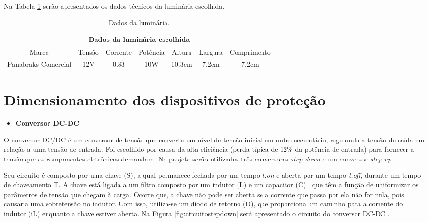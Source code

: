 Na Tabela \ref{tab:luminaria} serão apresentados os dados técnicos da luminária escolhida.

\begin{table}[H]
	\caption{Dados da luminária.}
	\begin{tabular}{|c|c|c|c|c|c|c|}
	\hline
	\multicolumn{7}{|c|}{Dados da luminária escolhida}                                                 \\ 		\hline
		Marca             & Tensão         & Corrente & Potência & Altura & Largura & Comprimento \\ 			\hline
	Panabraks Comercial  & 12V  & 0.83          & 10W   & 10.3cm & 7.2cm & 7.2cm \\ \hline

	\end{tabular}
    
    \label{tab:luminaria}
\end{table}
\FloatBarrier

\section{Dimensionamento dos dispositivos de proteção}

\begin{itemize}
    \item \textbf{Conversor DC-DC}
\end{itemize}
O conversor DC/DC  é um conversor de tensão que converte um nível de tensão inicial em outro secundário, regulando a tensão de saída em relação a uma tensão de entrada. Foi escolhido por causa da alta eficiência (perda típica de 12\% da potência de entrada) para fornecer a tensão que os componentes eletrônicos demandam. No projeto serão utilizados três conversores \textit{step-down} e um conversor \textit{step-up}.
    
Seu circuito é composto por uma chave (S), a qual permanece fechada por um tempo \textit{t.on} e aberta por um tempo \textit{t.off}, durante um tempo de chaveamento T. A chave está ligada a um filtro composto por um indutor (L) e um capacitor (C) , que têm a função de uniformizar os parâmetros de tensão que chegam à carga. Ocorre que, a chave não pode ser aberta se a corrente que passa por ela não for nula, pois causaria uma sobretensão no indutor. Com isso, utiliza-se um diodo de retorno (D), que proporciona um caminho para a corrente do indutor (iL) enquanto a chave estiver aberta. Na Figura \ref{fig:circuitostepdown} será apresentado o circuito do conversor DC-DC \cite{Amauri}.

